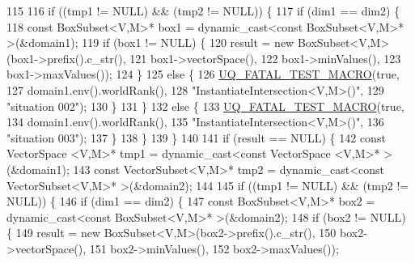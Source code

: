 \begin{DoxyCode}
115 
116     \textcolor{keywordflow}{if} ((tmp1 != NULL) && (tmp2 != NULL)) \{
117       \textcolor{keywordflow}{if} (dim1 == dim2) \{
118         \textcolor{keyword}{const} BoxSubset<V,M>* box1 = \textcolor{keyword}{dynamic\_cast<}\textcolor{keyword}{const }BoxSubset<V,M>* \textcolor{keyword}{>}(&domain1);
119         \textcolor{keywordflow}{if} (box1 != NULL) \{
120           result = \textcolor{keyword}{new} BoxSubset<V,M>(box1->prefix().c\_str(),
121                                              box1->vectorSpace(),
122                                              box1->minValues(),
123                                              box1->maxValues());
124         \}
125         \textcolor{keywordflow}{else} \{
126           \hyperlink{_defines_8h_a56d63d18d0a6d45757de47fcc06f574d}{UQ\_FATAL\_TEST\_MACRO}(\textcolor{keyword}{true},
127                               domain1.env().worldRank(),
128                               \textcolor{stringliteral}{"InstantiateIntersection<V,M>()"},
129                               \textcolor{stringliteral}{"situation 002"});
130         \}
131       \}
132       \textcolor{keywordflow}{else} \{
133         \hyperlink{_defines_8h_a56d63d18d0a6d45757de47fcc06f574d}{UQ\_FATAL\_TEST\_MACRO}(\textcolor{keyword}{true},
134                             domain1.env().worldRank(),
135                             \textcolor{stringliteral}{"InstantiateIntersection<V,M>()"},
136                             \textcolor{stringliteral}{"situation 003"});
137       \}
138     \}
139   \}
140 
141   \textcolor{keywordflow}{if} (result == NULL) \{
142     \textcolor{keyword}{const} VectorSpace <V,M>* tmp1 = \textcolor{keyword}{dynamic\_cast<}\textcolor{keyword}{const }VectorSpace <V,M>* \textcolor{keyword}{>}(&domain1);
143     \textcolor{keyword}{const} VectorSubset<V,M>* tmp2 = \textcolor{keyword}{dynamic\_cast<}\textcolor{keyword}{const }VectorSubset<V,M>* \textcolor{keyword}{>}(&domain2);
144 
145     \textcolor{keywordflow}{if} ((tmp1 != NULL) && (tmp2 != NULL)) \{
146       \textcolor{keywordflow}{if} (dim1 == dim2) \{
147         \textcolor{keyword}{const} BoxSubset<V,M>* box2 = \textcolor{keyword}{dynamic\_cast<}\textcolor{keyword}{const }BoxSubset<V,M>* \textcolor{keyword}{>}(&domain2);
148         \textcolor{keywordflow}{if} (box2 != NULL) \{
149           result = \textcolor{keyword}{new} BoxSubset<V,M>(box2->prefix().c\_str(),
150                                              box2->vectorSpace(),
151                                              box2->minValues(),
152                                              box2->maxValues());

\end{DoxyCode}
